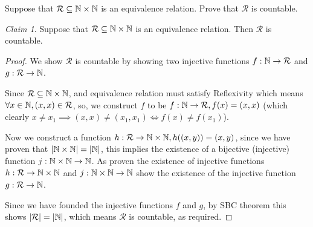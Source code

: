 \documentclass{homework}
\newcommand{\N}{\bb{N}} %
\newcommand{\relate}{\mathcal{R}}
\newcommand{\ra}{\rightarrow}
\newcommand{\?}{\stackrel{?}{=}}
\theoremstyle{remark}
\newtheorem*{claim}{Claim}
\begin{document}
\question[4] Suppose that $\relate\subseteq\N\times\N$ is an equivalence relation. Prove that $\relate$ is countable. 
\begin{claim}
     Suppose that $\relate\subseteq\N\times\N$ is an equivalence relation. Then $\relate$ is countable. 
\end{claim}
\begin{proof}
    We show $\relate$ is countable by showing two injective functions $f:\N\ra\relate$ and $g:\relate\ra\N$. 
    
    Since $\relate\subseteq\N\times\N$, and equivalence relation must satisfy Reflexivity which means $\forall x\in \N, (x,x)\in\relate$, so, we construct $f$ to be $f:\N\ra\relate, f(x)=(x,x)$ (which clearly $x\neq x_1\implies (x,x)\neq(x_1,x_1)\iff f(x)\neq f(x_1)$). 
    
    Now we construct a function $h:\relate\ra\N\times\N, h((x,y))=(x,y)$, since we have proven that $|\N\times\N|=|\N|$, this implies the existence of a bijective (injective) function $j: \N\times\N\ra\N$. As proven the existence of injective functions $h:\relate\ra\N\times\N$ and $j:\N\times\N\ra\N$ show the existence of the injective function $g: \relate\ra\N$. 
    
    Since we have founded the injective functions $f$ and $g$, by SBC theorem this shows $|\relate|=|\N|$, which means $\relate$ is countable, as required. 
    
\end{proof}
\end{document}
